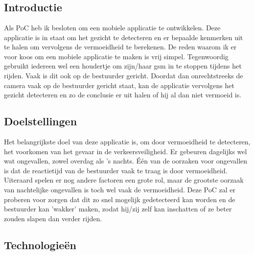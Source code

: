 \chapter{}%
\label{ch:proof-of-concept}

\section{Introductie}
Als PoC heb ik besloten om een mobiele applicatie te ontwikkelen. Deze applicatie is in staat om het gezicht te detecteren en er bepaalde kenmerken uit te halen om vervolgens de vermoeidheid te berekenen. De reden waarom ik er voor koos om een mobiele applicatie te maken is vrij simpel. Tegenwoordig gebruikt iedereen wel een houdertje om zijn/haar gsm in te stoppen tijdens het rijden. Vaak is dit ook op de bestuurder gericht. Doordat dan onrechtstreeks de camera vaak op de bestuurder gericht staat, kan de applicatie vervolgens het gezicht detecteren en zo de conclusie er uit halen of hij al dan niet vermoeid is.

\section{Doelstellingen}
Het belangrijkste doel van deze applicatie is, om door vermoeidheid te detecteren, het voorkomen van het gevaar in de verkeersveiligheid. Er gebeuren dagelijks wel wat ongevallen, zowel overdag als 's nachts. Één van de oorzaken voor ongevallen is dat de reactietijd van de bestuurder vaak te traag is door vermoeidheid. Uiteraard spelen er nog andere factoren een grote rol, maar de grootste oorzaak van nachtelijke ongevallen is toch wel vaak de vermoeidheid. Deze PoC zal er proberen voor zorgen dat dit zo snel mogelijk gedetecteerd kan worden en de bestuurder kan 'wakker' maken, zodat hij/zij zelf kan inschatten of ze beter zouden slapen dan verder rijden.

\section{Technologieën}
